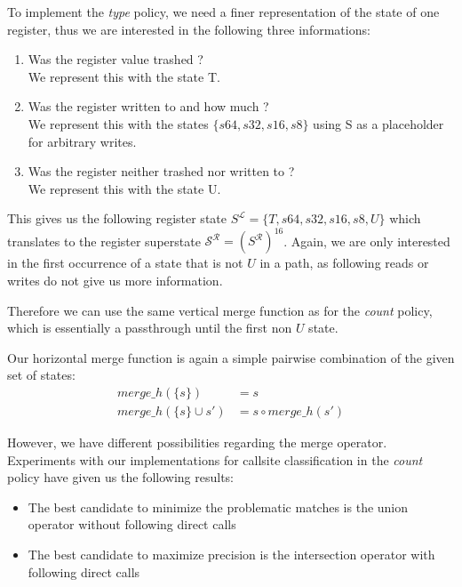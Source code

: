 To implement the \emph{type} policy, we need a finer representation of the state of one register, thus we are interested in the following three informations:
\begin{enumerate}
\item Was the register value trashed ? \\ We represent this with the state T.
\item Was the register written to and how much ? \\ We represent this with the states $\{ s64, s32, s16, s8 \}$ using S as a placeholder for arbitrary writes.
\item Was the register neither trashed nor written to ? \\ We represent this with the state U.
\end{enumerate}
This gives us the following register state $S^\mathcal{L} = \{ T, s64, s32, s16, s8, U \}$ which translates to the register superstate $\mathcal{S}^\mathcal{R} = (S^\mathcal{R})^{16}$.
Again, we are only interested in the first occurrence of a state that is not $U$ in a path, as following reads or writes do not give us more information.

Therefore we can use the same vertical merge function as for the \emph{count} policy, which is essentially a passthrough until the first non $U$ state.

Our horizontal merge function is again a simple pairwise combination of the given set of states:
\begin{align}
merge\_h(\{s\}) &= s\\
merge\_h(\{s\} \cup s') &= s \circ merge\_h(s')
\end{align}

However, we have different possibilities regarding the merge operator. Experiments with our implementations for callsite classification in the \emph{count} policy have given us the following results:
\begin{itemize}
\item The best candidate to minimize the problematic matches is the union operator without following direct calls
\item The best candidate to maximize precision is the intersection operator with following direct calls
\end{itemize}

